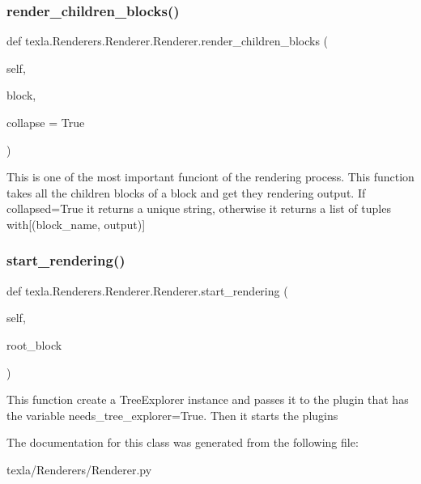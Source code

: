 \subsubsection{\texorpdfstring{render\+\_\+children\+\_\+blocks()}{render\_children\_blocks()}}
{\footnotesize\ttfamily def texla.\+Renderers.\+Renderer.\+Renderer.\+render\+\_\+children\+\_\+blocks (\begin{DoxyParamCaption}\item[{}]{self,  }\item[{}]{block,  }\item[{}]{collapse = {\ttfamily True} }\end{DoxyParamCaption})}

\begin{DoxyVerb}This is one of the most important funciont
of the rendering process.
This function takes all the children blocks of
a block and get they rendering output.
If collapsed=True it returns a unique string,
otherwise it returns a list of tuples with[(block_name, output)]
\end{DoxyVerb}
 \hypertarget{classtexla_1_1Renderers_1_1Renderer_1_1Renderer_a2f95c5cc5ea76c75cb5ee79df01f43f2}{}\label{classtexla_1_1Renderers_1_1Renderer_1_1Renderer_a2f95c5cc5ea76c75cb5ee79df01f43f2} 
\subsubsection{\texorpdfstring{start\+\_\+rendering()}{start\_rendering()}}
{\footnotesize\ttfamily def texla.\+Renderers.\+Renderer.\+Renderer.\+start\+\_\+rendering (\begin{DoxyParamCaption}\item[{}]{self,  }\item[{}]{root\+\_\+block }\end{DoxyParamCaption})}

\begin{DoxyVerb}This function create a TreeExplorer instance
and passes it to the plugin that has the variable
needs_tree_explorer=True. Then it starts the plugins\end{DoxyVerb}
 

The documentation for this class was generated from the following file\+:\begin{DoxyCompactItemize}
\item 
texla/\+Renderers/Renderer.\+py\end{DoxyCompactItemize}
